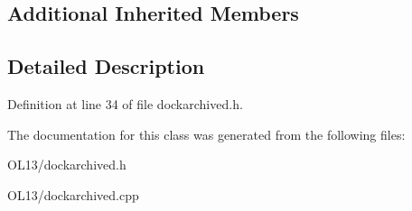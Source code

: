 \subsection*{Additional Inherited Members}


\subsection{Detailed Description}


Definition at line 34 of file dockarchived.\+h.



The documentation for this class was generated from the following files\+:\begin{DoxyCompactItemize}
\item 
O\+L13/dockarchived.\+h\item 
O\+L13/dockarchived.\+cpp\end{DoxyCompactItemize}
